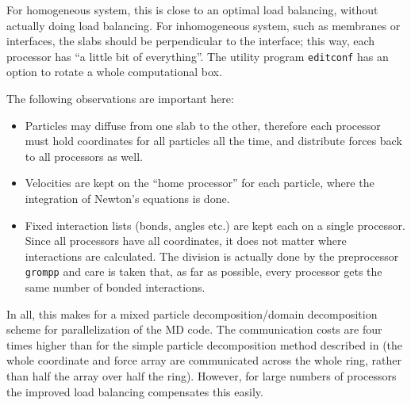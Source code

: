 For homogeneous system, this is close to an optimal load balancing,
without actually doing load balancing. For inhomogeneous system, such
as membranes or interfaces, the slabs should be perpendicular to the
interface; this way, each processor has ``a little bit of
everything''.  The {\gromacs} utility program {\tt editconf} has an
option to rotate a whole computational box.

The following observations are important here:
\begin{itemize}
\item   Particles may diffuse from one slab to the other, therefore each processor
        must hold coordinates for all particles all the time, and distribute forces
        back to all processors as well.
\item   Velocities are kept on the ``home processor'' for each particle,
        where the integration of Newton's equations is done.
\item   Fixed interaction lists (bonds, angles etc.) are kept each
        on a single processor.  Since all processors have all
        coordinates, it does not matter where interactions are
        calculated.  The division is actually done by the {\gromacs}
        preprocessor {\tt grompp} and care is taken that, as far as
        possible, every processor gets the same number of bonded
        interactions.
\end{itemize}

In all, this makes for a mixed particle decomposition/domain decomposition scheme
for parallelization of the MD code. The communication costs are four times higher
than for the simple particle decomposition method described in 
(the whole coordinate and force array are communicated across the whole ring,
rather than half the array over half the ring).
However, for large numbers of processors the improved load balancing 
compensates this easily.

